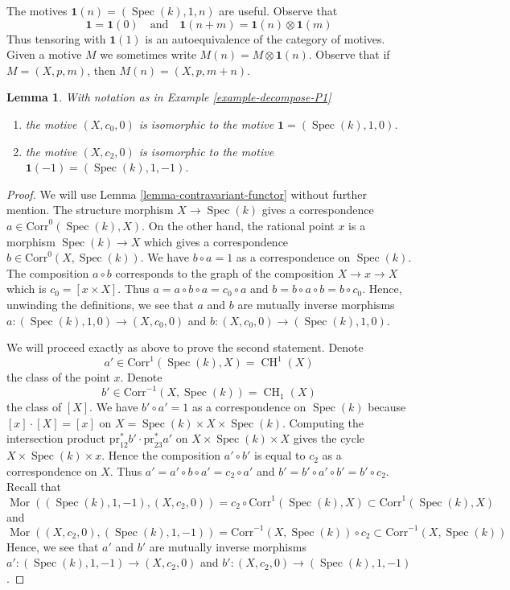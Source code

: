 \documentclass{stacks-project}
\theoremstyle{plain}
\newtheorem{lemma}[subsection]{Lemma}
\theoremstyle{definition}
\theoremstyle{remark}
\numberwithin{equation}{subsection}
\def\Spec{\mathop{\mathrm{Spec}}}
\def\Mor{\mathop{\mathrm{Mor}}\nolimits}
\def\CH{\mathop{\mathrm{CH}}\nolimits}
\begin{document}
\noindent
The motives $\mathbf{1}(n) = (\Spec(k), 1, n)$ are useful. Observe that
$$
\mathbf{1} = \mathbf{1}(0)
\quad\text{and}\quad
\mathbf{1}(n + m) = \mathbf{1}(n) \otimes \mathbf{1}(m)
$$
Thus tensoring with $\mathbf{1}(1)$ is an autoequivalence of the
category of motives. Given a motive $M$ we sometimes write
$M(n) = M \otimes \mathbf{1}(n)$. Observe that if $M = (X, p, m)$,
then $M(n) = (X, p, m + n)$.

\begin{lemma}
\label{lemma-inverse-h2}
With notation as in Example \ref{example-decompose-P1}
\begin{enumerate}
\item
the motive $(X, c_0, 0)$ is isomorphic to the motive
$\mathbf{1} = (\Spec(k), 1, 0)$.
\item
the motive $(X, c_2, 0)$ is isomorphic to the motive
$\mathbf{1}(-1) = (\Spec(k), 1, -1)$.
\end{enumerate}
\end{lemma}

\begin{proof}
We will use Lemma \ref{lemma-contravariant-functor} without further mention.
The structure morphism $X \to \Spec(k)$ gives a correspondence
$a \in \text{Corr}^0(\Spec(k), X)$. On the other hand, the rational
point $x$ is a morphism $\Spec(k) \to X$ which gives a correspondence
$b \in \text{Corr}^0(X, \Spec(k))$. We have $b \circ a = 1$ as a
correspondence on $\Spec(k)$. The composition $a \circ b$ corresponds
to the graph of the composition $X \to x \to X$ which is
$c_0 = [x \times X]$. Thus $a = a \circ b \circ a = c_0 \circ a$
and $b = b \circ a \circ b = b \circ c_0$.
Hence, unwinding the definitions, we see that
$a$ and $b$ are mutually inverse morphisms
$a : (\Spec(k), 1, 0) \to (X, c_0, 0)$ and
$b : (X, c_0, 0) \to (\Spec(k), 1, 0)$.

\medskip\noindent
We will proceed exactly as above to prove the second statement.
Denote
$$
a' \in \text{Corr}^1(\Spec(k), X) = \CH^1(X)
$$
the class of the point $x$. Denote
$$
b' \in \text{Corr}^{-1}(X, \Spec(k)) = \CH_1(X)
$$
the class of $[X]$. We have $b' \circ a' = 1$ as a correspondence
on $\Spec(k)$ because $[x] \cdot [X] = [x]$ on
$X = \Spec(k) \times X \times \Spec(k)$. Computing the
intersection product $\text{pr}_{12}^*b' \cdot \text{pr}_{23}^*a'$
on $X \times \Spec(k) \times X$ gives the cycle
$X \times \Spec(k) \times x$. Hence
the composition $a' \circ b'$ is equal to $c_2$ as a
correspondence on $X$. Thus $a' = a' \circ b \circ a' = c_2 \circ a'$
and $b' = b' \circ a' \circ b' = b' \circ c_2$. Recall that
$$
\Mor((\Spec(k), 1, -1), (X, c_2, 0)) =
c_2 \circ \text{Corr}^1(\Spec(k), X)
\subset
\text{Corr}^1(\Spec(k), X)
$$
and
$$
\Mor((X, c_2, 0), (\Spec(k), 1, -1)) =
\text{Corr}^{-1}(X, \Spec(k)) \circ c_2
\subset
\text{Corr}^{-1}(X, \Spec(k))
$$
Hence, we see that $a'$ and $b'$ are mutually inverse morphisms
$a' : (\Spec(k), 1, -1) \to (X, c_2, 0)$ and
$b' : (X, c_2, 0) \to (\Spec(k), 1, -1)$.
\end{proof}
\end{document}
